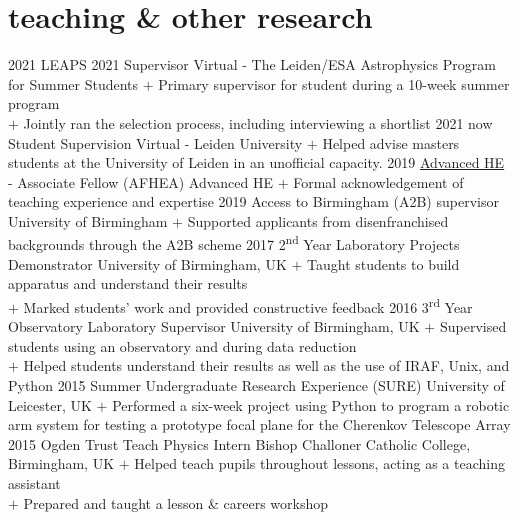 \documentclass[letterpaper]{k-cv} %
\begin{document}
\section{\color{c1}teaching \& other research}
\begin{entrylist}
	\centry
	{2021}
	{LEAPS 2021 \textcolor{c1}{Supervisor}}
	{Virtual - The Leiden/ESA Astrophysics Program for Summer Students}
	{$+$ Primary supervisor for student during a 10-week summer program\\
	 $+$ Jointly ran the selection process, including interviewing a shortlist}
	 \centry
	 {2021 \to now}
	 {Student Supervision}
	 {Virtual - Leiden University}
	 {$+$ Helped advise masters students at the University of Leiden in an unofficial capacity.}
	\centry
	{2019}
	{\href{https://www.heacademy.ac.uk/individuals/fellowship}{Advanced HE} - \textcolor{c1}{Associate Fellow} (AFHEA)}
	{Advanced HE}
	{$+$ Formal acknowledgement of teaching experience and expertise}
	\centry
	{2019}
	{Access to Birmingham (A2B) supervisor}
	{University of Birmingham}
	{$+$ Supported applicants from disenfranchised backgrounds through the A2B scheme}
	\centry
	{2017 }
	{2\textsuperscript{nd} Year Laboratory Projects Demonstrator}
	{University of Birmingham, UK}
	{$+$ Taught students to build apparatus and understand their results \\
	$+$ Marked students' work and provided constructive feedback}
	\centry
	{2016 }
	{3\textsuperscript{rd} Year Observatory Laboratory Supervisor}
	{University of Birmingham, UK}
	{$+$ Supervised students using an observatory and during data reduction\\
	$+$ Helped students understand their results as well as the use of IRAF, Unix, and Python}
	\centry
	{2015}
	{Summer Undergraduate Research Experience (SURE)}
	{University of Leicester, UK}
	{$+$ Performed a six-week project using Python to program a robotic arm system for testing a prototype focal plane for the Cherenkov Telescope Array}
	\centry
	{2015}
	{Ogden Trust Teach Physics Intern}
	{Bishop Challoner Catholic College, Birmingham, UK}
	{$+$ Helped teach pupils throughout lessons, acting as a teaching assistant\\
	 $+$ Prepared and taught a lesson \& careers workshop}
\end{entrylist}
\end{document}
